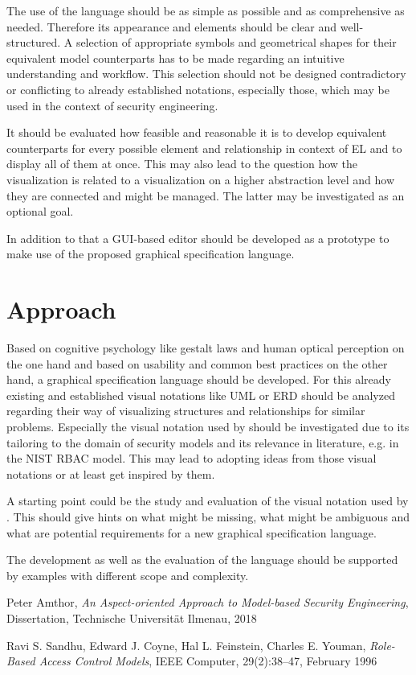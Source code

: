 \documentclass[12pt,a4paper]{article}
\begin{document}
The use of the language should be as simple as possible and as comprehensive as needed.
Therefore its appearance and elements should be clear and well-structured.
A selection of appropriate symbols and geometrical shapes for their equivalent model counterparts has to be made regarding an intuitive understanding and workflow.
This selection should not be designed contradictory or conflicting to already established notations, especially those, which may be used in the context of security engineering.

It should be evaluated how feasible and reasonable it is to develop equivalent counterparts for every possible element and relationship in context of EL and to display all of them at once.
This may also lead to the question how the visualization is related to a visualization on a higher abstraction level and how they are connected and might be managed.
The latter may be investigated as an optional goal.

In addition to that a GUI-based editor should be developed as a prototype to make use of the proposed graphical specification language.

\section{Approach} 
Based on cognitive psychology like gestalt laws and human optical perception on the one hand and based on usability and common best practices on the other hand, a graphical specification language should be developed.
For this already existing and established visual notations like UML or ERD should be analyzed regarding their way of visualizing structures and relationships for similar problems.
Especially the visual notation used by \citet*{Sandhu96} should be investigated due to its tailoring to the domain of security models and its relevance in literature, e.g. in the NIST RBAC model.
This may lead to adopting ideas from those visual notations or at least get inspired by them.

A starting point could be the study and evaluation of the visual notation used by \cite{Amthor18}.
This should give hints on what might be missing, what might be ambiguous and what are potential requirements for a new graphical specification language.

The development as well as the evaluation of the language should be supported by examples with different scope and complexity.


\DeclareRobustCommand{\citeext}[1]{\citeauthor{#1}~\cite{#1}}


\begin{thebibliography}{99}

  Peter Amthor,
 \emph{An Aspect-oriented Approach to Model-based Security Engineering},
  Dissertation,
  Technische Universität Ilmenau,
  2018
 

 Ravi S. Sandhu, Edward J. Coyne, Hal L. Feinstein, Charles E. Youman,
 \emph{Role-Based Access Control Models},
 IEEE Computer, 
 29(2):38–47, 
 February 1996

\end{thebibliography}
\end{document}
